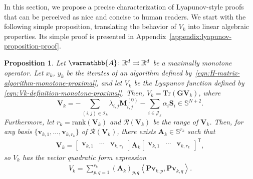 \documentclass{article}
\theoremstyle{definition}
\theoremstyle{plain}
\newtheorem{proposition}{Proposition}
\newcommand{\vv}{{\mathbf{v}}}
\newcommand{\vA}{{\mathbf{A}}}
\newcommand{\vG}{{\mathbf{G}}}
\newcommand{\vM}{{\mathbf{M}}}
\newcommand{\vP}{{\mathbf{P}}}
\newcommand{\vS}{{\mathbf{S}}}
\newcommand{\vV}{{\mathbf{V}}}
\newcommand{\cI}{{\mathcal{I}}}
\newcommand{\cJ}{{\mathcal{J}}}
\newcommand{\cR}{{\mathcal{R}}}
\newcommand{\Tr}{{\mathrm{Tr}}}
\newcommand{\reals}{\mathbb{R}}
\newcommand{\opA}{{\varmathbb{A}}}
\newcommand{\inprod}[2]{\left\langle #1,#2 \right\rangle}
\newcommand{\transpose}{\mathsf{T}}
\begin{document}
In this section, we propose a precise characterization of Lyapunov-style proofs that can be perceived as nice and concise to human readers.
We start with the following simple proposition, translating the behavior of $V_k$ into linear algebraic properties.
Its simple proof is presented in Appendix~\ref{appendix:lyapunov-proposition-proof}.

\begin{proposition}
\label{proposition:linear-algebra-of-lyapunov}
Let $\opA\colon \reals^d \rightrightarrows \reals^d$ be a maximally monotone operator.
Let $x_k$, $y_k$ be the iterates of an algorithm defined by~\eqref{eqn:H-matrix-algorithm-monotone-proximal},
and let $V_k$ be the Lyapunov function defined by \eqref{eqn:Vk-definition-monotone-proximal}.
Then, $V_k = \Tr(\vG\vV_k)$, where 
\[
    \vV_k = -\sum_{(i,j) \in \cI_k} \lambda_{i,j} \vM_{i,j}^{(0)} - \sum_{i\in \cJ_k} \alpha_i \vS_i \in \mathbb{S}^{N+2} .
\]
Furthermore, let $r_k = \mathrm{rank}(\vV_k)$ and $\cR(\vV_k)$ be the range of $\vV_k$.
Then, for any basis $\{\vv_{k,1}, \dots, \vv_{k,r_k}\}$ of $\cR(\vV_k)$, there exists $\vA_k \in \mathbb{S}^{r_k}$ such that
\begin{align}
\label{eqn:Lyapunov-expression-matrix-decomposition}
    \vV_k = \begin{bmatrix} \vv_{k,1} & \cdots & \vv_{k,r_k} \end{bmatrix} \vA_k \begin{bmatrix} \vv_{k,1} & \cdots & \vv_{k,r_k} \end{bmatrix}^\transpose ,
\end{align}
so $V_k$ has the vector quadratic form expression
\begin{align}
\label{eqn:Lyapunov-expression-quadratic-form}
    V_k = \sum_{p,q=1}^{r_k} (\vA_k)_{p,q} \inprod{\vP\vv_{k,p}}{\vP\vv_{k,q}} .
\end{align}
\end{proposition}
\end{document}
